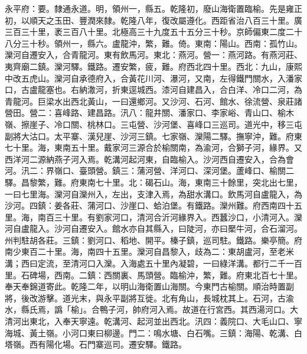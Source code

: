 \begin{pinyinscope}
永平府：要。隸通永道。明，領州一，縣五。乾隆初，廢山海衛置臨榆。先是雍正初，以順天之玉田、豐潤來隸。乾隆八年，復改屬遵化。西距省治八百三十里。廣三百三十里，袤三百八十里。北極高三十九度五十五分三十秒。京師偏東二度二十八分三十秒。領州一，縣六。盧龍沖，繁，難。倚。東南：陽山。西南：孤竹山。灤河自遷安入，合青龍河。東有飲馬河。東北：燕河。營一：燕河路。有燕河莊、夷齊廟二鎮。灤河驛。鐵路。遷安繁，疲，難。府西北四十里。西北：九山，康熙中改五虎山。灤河自承德府入，合黃花川河、瀑河，又南，左得鐵門關水，入潘家口，古盧龍塞也。右納潵河，折東逕城西。漆河自建昌入，合白洋、冷口二河，為青龍河。巨梁水出西北黃山，一曰還鄉河。又沙河、石河、館水、徐流營、泉莊諸營田。營二：喜峰路、建昌路。汛八：龍井關、潘家口、李家峪、青山口、榆木嶺、擦崖子、冷口關、桃林口。三屯營、沙河堡、喜峰口三巡司。道光中，移三屯副將大沽口。太平寨、漢兒崖、沙河三鎮。七家嶺、灤陽二驛。撫寧沖，難。府東七十里。海，東南五十里。戴家河三源合於榆關南，為渝河，合獅子河，緣界。又西洋河二源納燕子河入焉。乾溝河起河東，自臨榆入。沙河西自遷安入，合為會河。汛二：界嶺口、臺頭營。鎮三：蒲河營、洋河口、深河堡。蘆峰口、榆關二驛。昌黎繁，難。府東南七十里。北：碣石山。海，東南三十餘里，突北出七里，一曰七里海。灤河自灤州入，左出，支津入焉，為甜水溝口。飲馬河自盧龍入，為沙河。四鎮：姜各莊、蒲河口、沙崖口、蛤泊堡。有鐵路。灤州難。府西南四十五里。海，南百三十里。有劉家河口，清河合沂河緣界入。西蠶沙口，小清河入。灤河自盧龍入。沙河自遷安入。館水亦自其縣入，曰陡河，亦曰檿牛河，合石溜河。州判駐胡各莊。三鎮：劉河口、稻地、開平。榛子鎮，巡司駐。鐵路。樂亭簡。府南少東百二十里。海，南四十五里。灤河自昌黎入，歧為二：東胡盧河，至老米溝；西曰定流，至清河口入灤。入海處五十里內凝碧，一曰綠洋溝。都行二千一百里。石碑場，西南。二鎮：西關裏、馬頭營。臨榆沖，繁，難。府東北百七十里。奉天奉錦道寄此。乾隆二年，以明山海衛置山海關。今東門古榆關。順治時置副將，後改游擊。道光末，與永平副將互徙。北有角山，長城枕其上。石河，古渝水，縣氏焉，譌「榆」。合鴨子河，帥府河入焉。故道在行宮西。其西湯河口。大清河出東北，入奉天寧遠。乾溝河、起河並出西北。汛四：義院口、大毛山口、寧海城、黃土嶺。小河口東曰柳邊。門二：鳴水塘、白石嘴。三鎮：海陽、乾溝、白塔嶺。西有陽化場。石門寨巡司。遷安驛。鐵路。


\end{pinyinscope}
